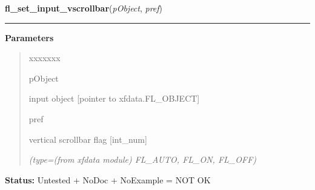 \hspace{.8\funcindent}\begin{boxedminipage}{\funcwidth}

    \raggedright \textbf{fl\_set\_input\_vscrollbar}(\textit{pObject}, \textit{pref})

    \vspace{-1.5ex}

    \rule{\textwidth}{0.5\fboxrule}
\setlength{\parskip}{2ex}
\setlength{\parskip}{1ex}
      \textbf{Parameters}
      \vspace{-1ex}

      \begin{quote}
        \begin{Ventry}{xxxxxxx}

          \item[pObject]

          input object [pointer to xfdata.FL\_OBJECT]

          \item[pref]

          vertical scrollbar flag [int\_num]

            {\it (type=(from xfdata module) FL\_AUTO, FL\_ON, FL\_OFF)}

        \end{Ventry}

      \end{quote}

\textbf{Status:} Untested + NoDoc + NoExample = NOT OK



    \end{boxedminipage}

    \label{xformslib:library:fl_set_input_topline}

    \vspace{0.5ex}

